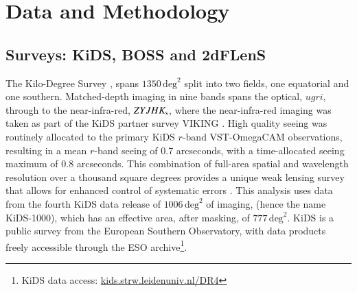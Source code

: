 \section{Data and Methodology}
\label{sec:data}

\subsection{Surveys:  KiDS, BOSS and 2dFLenS}
\label{sec:surveys}

The Kilo-Degree Survey \citep[KiDS,][]{dejong/etal:2013}, spans $1350\,\mathrm{deg}^{2}$ split into two fields, one
equatorial and one southern.    Matched-depth imaging in nine bands spans the optical,
$ugri$, through to the near-infra-red, $ZYJHK_{\rm s}$, where the
near-infra-red imaging was taken as part of the KiDS partner survey
VIKING \citep[the VISTA Kilo-degree INfrared Galaxy
survey,][]{edge/etal:2013}.  High quality seeing was
routinely allocated to the primary KiDS $r$-band VST-OmegaCAM observations, resulting in a
mean $r$-band seeing of 0.7 arcseconds, with a time-allocated seeing maximum of 0.8
arcseconds.  This combination of full-area spatial and wavelength
resolution over a thousand square degrees
provides a unique weak lensing survey that allows for enhanced
control of systematic errors \citep{giblin/etal:inprep, hildebrandt/etal:inprep}.
This analysis uses data from the fourth KiDS
data release of $1006\,\mathrm{deg}^{2}$ of imaging, (hence the name KiDS-1000), which has an effective
area, after masking, of $777\,\mathrm{deg}^{2}$.  KiDS is a public survey from the European Southern
Observatory, with data products freely accessible through the ESO
archive\footnote{KiDS data access: \href{http://kids.strw.leidenuniv.nl/DR4}{kids.strw.leidenuniv.nl/DR4}}.   

